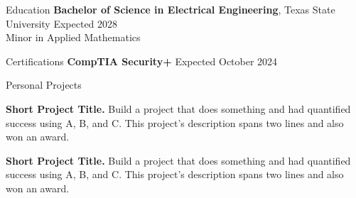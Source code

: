 \documentclass{resume} %
\begin{document}

    \begin{rSection}{Education}
        {\bf Bachelor of Science in Electrical Engineering}, Texas State University \hfill {Expected 2028} \\
        Minor in Applied Mathematics \smallskip
    \end{rSection}

    \begin{rSection}{Certifications}
        {\bf CompTIA Security+} \hfill {Expected October 2024}
    \end{rSection}

    \begin{rSection}{Personal Projects} \vspace{-1.25em}
        \item \textbf{Short Project Title.} {Build a project that does something and had quantified success using A, B, and C. This project's description spans two lines and also won an award.}
        \item \textbf{Short Project Title.} {Build a project that does something and had quantified success using A, B, and C. This project's description spans two lines and also won an award.}
    \end{rSection} 
\end{document}
